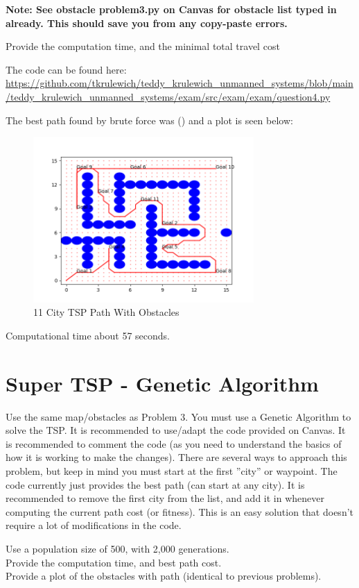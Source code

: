 \documentclass{article}
\begin{document}
\bigskip
\noindent\textbf{Note: See obstacle problem3.py on Canvas for obstacle list typed in already. This should
save you from any copy-paste errors.}

\bigskip
\noindent Provide the computation time, and the minimal total travel cost

\bigskip
The code can be found here: \\
\url{https://github.com/tkrulewich/teddy_krulewich_unmanned_systems/blob/main/teddy_krulewich_unmanned_systems/exam/src/exam/exam/question4.py}


The best path found by brute force was () and a plot is seen below:

\begin{figure}[H]
\centering
\includegraphics[width=0.75\textwidth]{images/question4.png}
\caption*{11 City TSP Path With Obstacles}
\end{figure}

Computational time about 57 seconds.

\section{Super TSP - Genetic Algorithm}

Use the same map/obstacles as Problem 3. You must use a
Genetic Algorithm to solve the TSP. It is recommended to use/adapt the code provided on Canvas. It
is recommended to comment the code (as you need to understand the basics of how it is working to
make the changes). There are several ways to approach this problem, but keep in mind you must start
at the first ”city” or waypoint. The code currently just provides the best path (can start at any city).
It is recommended to remove the first city from the list, and add it in whenever computing the current
path cost (or fitness). This is an easy solution that doesn’t require a lot of modifications in the code.

\bigskip
\noindent Use a population size of 500, with 2,000 generations. \\
Provide the computation time, and best path cost. \\
Provide a plot of the obstacles with path (identical to previous problems).
\end{document}
